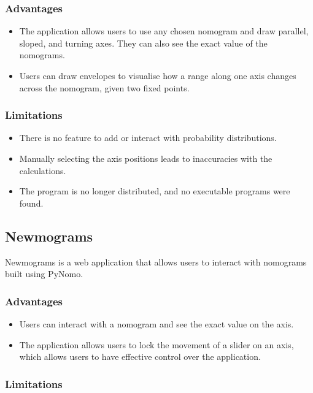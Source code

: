\documentclass{l4proj}
\begin{document}
\subsubsection{{Advantages}}
\begin{itemize}
    \item The application allows users to use any chosen nomogram and draw parallel, sloped, and turning axes. They can also see the exact value of the nomograms. 
    \item Users can draw envelopes to visualise how a range along one axis changes across the nomogram, given two fixed points.

\end{itemize}
\subsubsection{{Limitations}}
\begin{itemize}
    \item There is no feature to add or interact with probability distributions.
    
    \item Manually selecting the axis positions leads to inaccuracies with the calculations. 
    \item The program is no longer distributed, and no executable programs were found. 
    
\end{itemize}

\subsection{Newmograms}

Newmograms is a web application that allows users to interact with nomograms built using PyNomo. 

\subsubsection{{Advantages}}
\begin{itemize}
    \item Users can interact with a nomogram and see the exact value on the axis. 
    \item The application allows users to lock the movement of a slider on an axis, which allows users to have effective control over the application. 
\end{itemize}

\subsubsection{{Limitations}}
\end{document}
